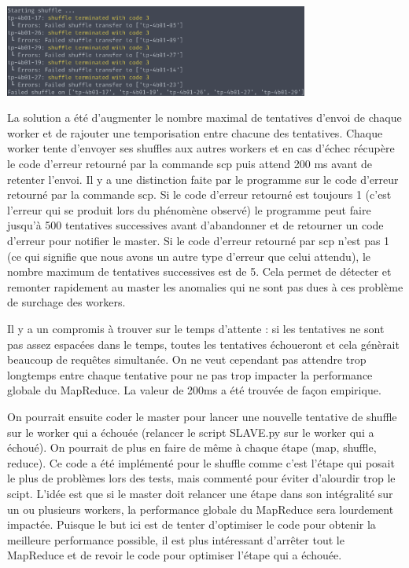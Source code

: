 \documentclass[11pt,a4paper]{article}
\begin{document}
\includegraphics[width=10cm]{screenshot_shuffle7.png}

La solution a été d'augmenter le nombre maximal de tentatives d'envoi de chaque worker et de rajouter une temporisation entre chacune des tentatives. Chaque worker tente d'envoyer ses shuffles aux autres workers et en cas d'échec récupère le code d'erreur retourné par la commande scp puis attend 200 ms avant de retenter l'envoi. Il y a une distinction faite par le programme sur le code d'erreur retourné par la commande scp. Si le code d'erreur retourné est toujours 1 (c'est l'erreur qui se produit lors du phénomène observé) le programme peut faire jusqu'à 500 tentatives successives avant d'abandonner et de retourner un code d'erreur pour notifier le master. Si le code d'erreur retourné par scp n'est pas 1 (ce qui signifie que nous avons un autre type d'erreur que celui attendu), le nombre maximum de tentatives successives est de 5. Cela permet de détecter et remonter rapidement au master les anomalies qui ne sont pas dues à ces problème de surchage des workers.

Il y a un compromis à trouver sur le temps d'attente : si les tentatives ne sont pas assez espacées dans le temps, toutes les tentatives échoueront et cela génèrait beaucoup de requêtes simultanée. On ne veut cependant pas attendre trop longtemps entre chaque tentative pour ne pas trop impacter la performance globale du MapReduce. La valeur de 200ms a été trouvée de façon empirique.

On pourrait ensuite coder le master pour lancer une nouvelle tentative de shuffle sur le worker qui a échouée (relancer le script SLAVE.py sur le worker qui a échoué). On pourrait de plus en faire de même à chaque étape (map, shuffle, reduce). Ce code a été implémenté pour le shuffle comme c'est l'étape qui posait le plus de problèmes lors des tests, mais commenté pour éviter d'alourdir trop le scipt. L'idée est que si le master doit relancer une étape dans son intégralité sur un ou plusieurs workers, la performance globale du MapReduce sera lourdement impactée. Puisque le but ici est de tenter d'optimiser le code pour obtenir la meilleure performance possible, il est plus intéressant d'arrêter tout le MapReduce et de revoir le code pour optimiser l'étape qui a échouée.
\end{document}
